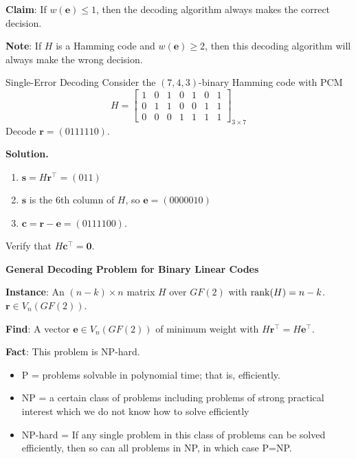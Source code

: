 \textbf{Claim}: If $ w(\symbf{e})\leqslant 1 $, then the decoding algorithm always
makes the correct decision.

\textbf{Note}: If $ H $ is a Hamming code and $ w(\symbf{e})\geqslant 2 $,
then this decoding algorithm will always make the wrong decision.

\begin{Example}{Single-Error Decoding}{}
    Consider the $ (7,4,3) $-binary Hamming code with PCM
    \[ H=\begin{bmatrix}
            1 & 0 & 1 & 0 & 1 & 0 & 1 \\
            0 & 1 & 1 & 0 & 0 & 1 & 1 \\
            0 & 0 & 0 & 1 & 1 & 1 & 1
        \end{bmatrix}_{3\times 7} \]
    Decode $ \symbf{r}=(0111110) $.

    \textbf{Solution.}
    \begin{enumerate}
        \item $ \symbf{s}=H\symbf{r}^\top=(011) $
        \item $ \symbf{s} $ is the 6th column of $ H $, so $ \symbf{e}=(0000010) $
        \item $ \symbf{c}=\symbf{r}-\symbf{e}=(0111100) $.
    \end{enumerate}
    Verify that $ H\symbf{c}^\top=\symbf{0} $.
\end{Example}

\textbf{General Decoding Problem for Binary Linear Codes}

\textbf{Instance}: An $ (n-k)\times n $ matrix $ H $ over $ GF(2) $
with $ \operatorname{rank}(H)=n-k $. $ \symbf{r}\in V_n(GF(2)) $.

\textbf{Find}: A vector $ \symbf{e}\in V_n(GF(2)) $ of minimum weight
with $ H\symbf{r}^\top=H\symbf{e}^\top $.

\textbf{Fact}: This problem is NP-hard.

\begin{itemize}
    \item P = problems solvable in polynomial time; that is, efficiently.
    \item NP = a certain class of problems including problems of strong
          practical interest which we do not know how to solve efficiently
    \item NP-hard = If any single problem in this class of problems can be
          solved efficiently, then so can all problems in NP, in which case P=NP\@.
\end{itemize}
